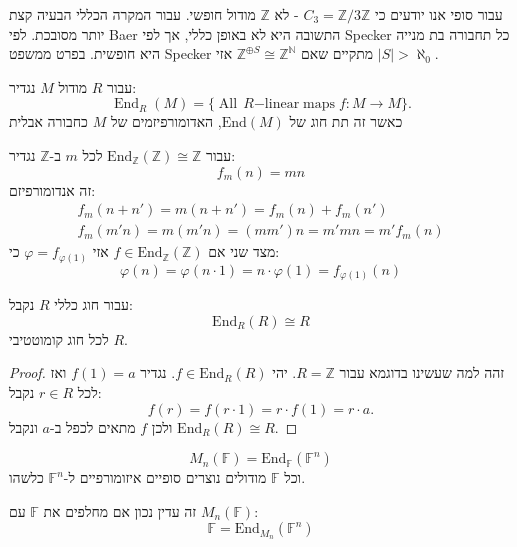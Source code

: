 \documentclass{tstextbook}
\begin{document}
\begin{example}
עבור סופי אנו יודעים כי \(C_{3}=\mathbb{Z} / 3\mathbb{Z}\) - לא \(\mathbb{Z}\) מודול חופשי.
עבור המקרה הכללי הבעיה קצת יותר מסובכת. לפי Baer התשובה היא לא באופן כללי, אך לפי Specker כל תחבורה בת מנייה היא חופשית. בפרט ממשפט Specker מתקיים שאם \(\mathbb{Z}^{\oplus S}\cong \mathbb{Z}^{\mathbb{N}}\) אזי \(\lvert S \rvert> \aleph_{0}\).

\end{example}
\begin{definition}
עבור \(R\) מודול \(M\) נגדיר:
$$\operatorname{End}_{R}(M)=\{\operatorname{All}\,R{\mathrm{-linear\;maps}}\;f:M\to M\}.$$
כאשר זה תת חוג של \(\mathrm{End}(M)\), האדומורפיזמים של \(M\) כחבורה אבלית

\end{definition}
\begin{example}
עבור \(\mathrm{End}_{\mathbb{Z}}(\mathbb{Z})\cong \mathbb{Z}\) לכל \(m\) ב-\(\mathbb{Z}\) נגדיר:
$$f_{m}(n)=mn$$
זה אנדומורפיזם:
\begin{gather*}f_{m}(n+n')=m(n+n')=f_{m}(n)+f_{m}(n')\\ f_{m}(m'n)=m(m'n)=(mm')n=m'mn=m'f_{m}(n)
\end{gather*}
מצד שני אם \(f \in \mathrm{End}_{\mathbb{Z}}(\mathbb{Z})\) אזי \(\varphi=f_{\varphi(1)}\) כי:
$$\varphi(n)=\varphi(n\cdot 1)=n\cdot \varphi( 1)=f_{\varphi(1)}(n)$$

\end{example}
\begin{corollary}
עבור חוג כללי \(R\) נקבל:
$$\mathrm{End}_{R}(R)\cong  R$$
לכל חוג קומוטטיבי \(R\).

\end{corollary}
\begin{proof}
זהה למה שעשינו בדוגמא עבור \(R=\mathbb{Z}\). יהי \(f \in \mathrm{End}_{R}(R)\). נגדיר \(f(1)=a\) ואז לכל \(r \in R\) נקבל:
$$f(r)=f(r\cdot1)=r\cdot f(1)=r\cdot a.$$
ולכן \(f\) מתאים לכפל ב-\(a\) ונקבל \(\mathrm{End}_{R}(R)\cong R\).

\end{proof}
\begin{proposition}
$$M_{n}(\mathbb{F} )=\mathrm{End}_{\mathbb{F} }(\mathbb{F} ^{n})$$
וכל \(\mathbb{F}\) מודולים נוצרים סופיים איזומורפיים ל-\(\mathbb{F}^{n}\) כלשהו.

\end{proposition}
\begin{remark}
זה עדין נכון אם מחלפים את \(\mathbb{F}\) עם \(M_{n}(\mathbb{F})\):
$$\mathbb{F} = \mathrm{End}_{M_{n}}(\mathbb{F}^{n} )$$

\end{remark}
\end{document}

